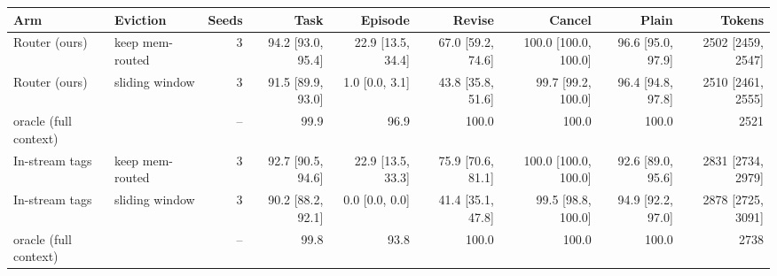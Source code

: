 \begin{tabular}{llrrrrrrr}
\toprule
Arm & Eviction & Seeds & Task & Episode & Revise & Cancel & Plain & Tokens \\
\midrule
Router (ours) & keep mem-routed & 3 & 94.2 {\scriptsize[93.0, 95.4]} & 22.9 {\scriptsize[13.5, 34.4]} & 67.0 {\scriptsize[59.2, 74.6]} & 100.0 {\scriptsize[100.0, 100.0]} & 96.6 {\scriptsize[95.0, 97.9]} & 2502 {\scriptsize[2459, 2547]} \\
Router (ours) & sliding window & 3 & 91.5 {\scriptsize[89.9, 93.0]} & 1.0 {\scriptsize[0.0, 3.1]} & 43.8 {\scriptsize[35.8, 51.6]} & 99.7 {\scriptsize[99.2, 100.0]} & 96.4 {\scriptsize[94.8, 97.8]} & 2510 {\scriptsize[2461, 2555]} \\
\quad oracle (full context) & & -- & {\color{gray}99.9} & {\color{gray}96.9} & {\color{gray}100.0} & {\color{gray}100.0} & {\color{gray}100.0} & {\color{gray}2521} \\
In-stream tags & keep mem-routed & 3 & 92.7 {\scriptsize[90.5, 94.6]} & 22.9 {\scriptsize[13.5, 33.3]} & 75.9 {\scriptsize[70.6, 81.1]} & 100.0 {\scriptsize[100.0, 100.0]} & 92.6 {\scriptsize[89.0, 95.6]} & 2831 {\scriptsize[2734, 2979]} \\
In-stream tags & sliding window & 3 & 90.2 {\scriptsize[88.2, 92.1]} & 0.0 {\scriptsize[0.0, 0.0]} & 41.4 {\scriptsize[35.1, 47.8]} & 99.5 {\scriptsize[98.8, 100.0]} & 94.9 {\scriptsize[92.2, 97.0]} & 2878 {\scriptsize[2725, 3091]} \\
\quad oracle (full context) & & -- & {\color{gray}99.8} & {\color{gray}93.8} & {\color{gray}100.0} & {\color{gray}100.0} & {\color{gray}100.0} & {\color{gray}2738} \\
\bottomrule
\end{tabular}
